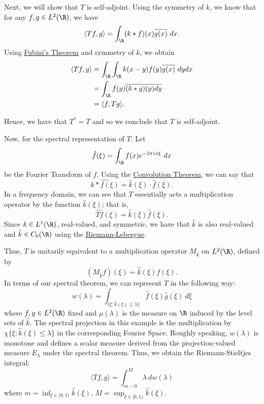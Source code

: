    Next, we will show that \( T  \) is self-adjoint. Using the symmetry of \( k  \), we know that for any \( f,g \in L^{2}(\R) \), we have 
   \[  \langle Tf  , g  \rangle = \int_{ \R  } (k * f)(x) \overline{g(x)}   \ dx. \]
   Using {\hyperref[Fubini's Theorem]{Fubini's Theorem}}  and symmetry of \( k  \), we obtain
   \begin{align*}
       \langle Tf , g  \rangle &= \int_{ \R  } \int_{ \R  } k (x-y) f(y) \overline{g(x)} \ dy dx \\
                               &=  \int_{\R} f(y) \overline{(k * g)(y) dy} \\
                               &= \langle f , Tg \rangle.
\end{align*}

Hence, we have that \( T^{*} = T  \) and so we conclude that \( T  \) is self-adjoint.

Now, for the spectral representation of \( T \). Let 
\[ \hat{f}(\xi) = \int_{ \R } f(x) e^{-2 \pi i x \xi}  \ dx  \]
be the Fourier Transform of \( f \). Using the {\hyperref[Convolution Theorem]{Convolution Theorem}}, we can say that 
\[  \hat{k * f(\xi)} = \hat{k}(\xi) \cdot \hat{f} (\xi). \]
In a frequency domain, we can see that \( T  \) essentially acts a multiplication operator by the function \( \hat{k}(\xi) \); that is, 
\[  \hat{Tf}(\xi) = \hat{k}(\xi) \hat{f}(\xi). \]
Since \( k \in L^{1} (\R) \), real-valued, and symmetric, we have that \( \hat{k} \) is also real-valued and \( \hat{k} \in {C}_{0}(\R) \) using the {\hyperref[Riemann-Lebesgue]{Riemann-Lebesgue}}.

Thus, \( T  \) is unitarily equivalent to a multiplication operator \( {M}_{\hat{k}}  \) on \( L^{2}(\R) \), defined by 
\[  ({M}_{\hat{k}}f)(\xi) = \hat{k}(\xi) f(\xi). \]
In terms of our spectral theorem, we can represent \( T  \) in the following way:
\[  w(\lambda) = \int_{ \{ \xi: \hat{k}(\xi) \leq \lambda \} } \hat{f}(\xi) \overline{\hat{g}(\xi)}    \ d \xi \]
where \( f,g \in L^{2}(\R) \) fixed and \( \mu(\lambda) \) is the measure on \( \R  \) induced by the level sets of \( \hat{k} \). The spectral projection in this example is the multiplication by \( \chi \{ \xi : \hat{k}(\xi) \leq \lambda \}  \) in the corresponding Fourier Space. Roughly speaking, \( w(\lambda) \) is monotone and defines a scalar measure derived from the projection-valued measure \( {E}_{\lambda} \) under the spectral theorem. Thus, we obtain the Riemann-Stieltjes integral: 
\[  \langle Tf  ,  g  \rangle = \int_{ m - 0  }^{ M  }  \lambda  \ d w(\lambda) \]
where \( m = \inf_{\xi \in [0,1)} \hat{k}(\xi) \), \( M = \sup_{\xi \in [0,1)} \hat{k}(\xi) \).

